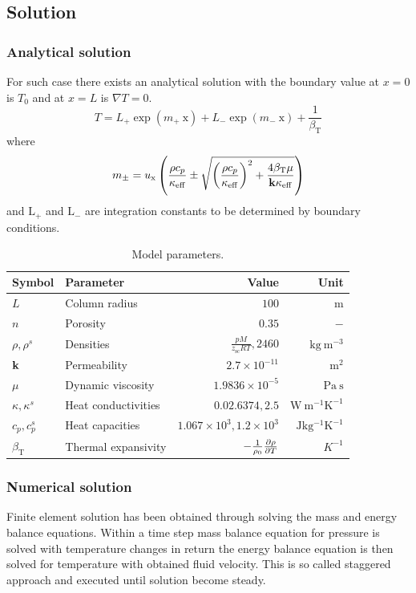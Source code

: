 \subsection{Solution}
\subsubsection{Analytical solution}
For such case there exists an analytical solution with the boundary value at $x=0$ is $T_0$ and at $x=L$ is $\nabla T=0$.
\begin{equation}
T=L_+\exp(m_+~\mathrm x)+L_-\exp(m_-~\mathrm x)+\frac{1}{\beta_{\mathrm T}}
\label{eq:AnlyticalSolution}
\end{equation}
where 
\begin{equation*}
m_{\pm}=u_{\mathrm x}\left(\frac{\rho c_p}{\kappa_{\mathrm {eff} }}\pm\sqrt{\left(\frac{\rho c_p}{\kappa_{\mathrm {eff} }}\right)^2 + \frac{4\beta_{\mathrm T}\mu}{\k \kappa_{\mathrm {eff} }}} \right)
\label{eq:AnlyticalSolutionPart}
\end{equation*}
 and $\mathrm {L_+}$ and $\mathrm {L_-}$ are integration constants to be determined by boundary conditions.
\begin{table}[htb]
\caption{\label{tab:JTC}Model parameters.}
\begin{center}
\begin{tabular}{llrr}
\toprule
Symbol & Parameter & Value & Unit \\
\midrule
$L$ & Column radius & $100$ & $\mathrm {m}$\\
$n$ & Porosity & $0.35$ & $-$ \\
$\rho,\rho^s$ & Densities & $\frac{p M}{z_{\mathrm {sc}} R T}, 2460$ & $\mathrm {kg~m^{-3}}$\\
$\mathbf k$ & Permeability & $2.7\times 10^{-11}$ & $\mathrm {m^2}$\\
$\mu$ & Dynamic viscosity & $1.9836\times10^{-5}$ & $\mathrm {Pa~s}$\\
$\kappa, \kappa^s$ & Heat conductivities & $0.02.6374, 2.5$ & $\mathrm {W~m^{-1} K^{-1}}$\\
$c_p, c_p^s$ & Heat capacities & $1.067\times10^3, 1.2\times10^3$ & $\mathrm {J kg^{-1} K^{-1}}$\\
$\beta_{\mathrm T}$ & Thermal expansivity & $-\frac{1}{\rho_0}\frac{\partial \rho}{\partial T}$ & $K^{-1}$\\
\bottomrule
\end{tabular}
\end{center}
\end{table}
\subsubsection{Numerical solution}
\vspace{-0.2cm}Finite element solution has been obtained through solving the mass and energy balance equations. Within a time step mass balance equation for pressure is solved with temperature changes in return the energy balance equation is then solved for temperature with obtained fluid velocity. This is so called staggered approach and executed until solution become steady.


